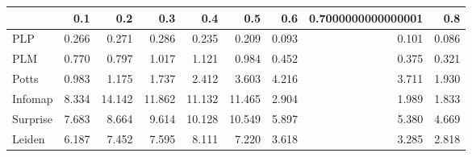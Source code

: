 \begin{tabular}{lrrrrrrrr}
\toprule
{} &   0.1 &    0.2 &    0.3 &    0.4 &    0.5 &   0.6 & 0.7000000000000001 &   0.8 \\
\midrule
PLP      & 0.266 &  0.271 &  0.286 &  0.235 &  0.209 & 0.093 &              0.101 & 0.086 \\
PLM      & 0.770 &  0.797 &  1.017 &  1.121 &  0.984 & 0.452 &              0.375 & 0.321 \\
Potts    & 0.983 &  1.175 &  1.737 &  2.412 &  3.603 & 4.216 &              3.711 & 1.930 \\
Infomap  & 8.334 & 14.142 & 11.862 & 11.132 & 11.465 & 2.904 &              1.989 & 1.833 \\
Surprise & 7.683 &  8.664 &  9.614 & 10.128 & 10.549 & 5.897 &              5.380 & 4.669 \\
Leiden   & 6.187 &  7.452 &  7.595 &  8.111 &  7.220 & 3.618 &              3.285 & 2.818 \\
\bottomrule
\end{tabular}
